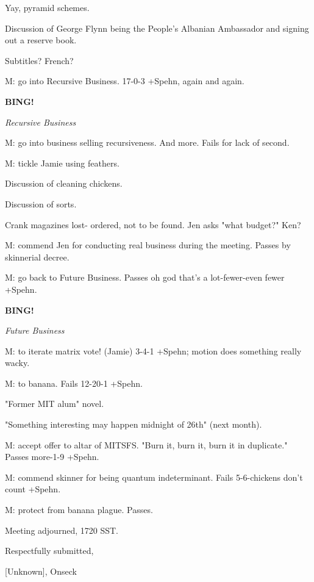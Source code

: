 \documentclass[12pt]{article}
\newcommand{\bing}{{\bf BING!} }
\newcommand{\goto}[1]{\bing \vskip 12pt \centerline{{\em{#1}}}}
\begin{document}
Yay, pyramid schemes.

Discussion of George Flynn being the People's Albanian Ambassador and signing out a reserve book.

Subtitles? French?

M: go into Recursive Business. 17-0-3 +Spehn, again and again.

\goto{Recursive Business}

M: go into business selling recursiveness. And more. Fails for lack of second.

M: tickle Jamie using feathers.

Discussion of cleaning chickens.

Discussion of sorts.

Crank magazines lost- ordered, not to be found. Jen asks "what budget?" Ken?

M: commend Jen for conducting real business during the meeting. Passes by skinnerial decree.

M: go back to Future Business. Passes oh god that's a lot-fewer-even fewer +Spehn.

\goto{Future Business}

M: to iterate matrix vote! (Jamie) 3-4-1 +Spehn; motion does something really wacky.

M: to banana. Fails 12-20-1 +Spehn.

"Former MIT alum" novel.

"Something interesting may happen midnight of 26th" (next month).

M: accept offer to altar of MITSFS. "Burn it, burn it, burn it in duplicate." Passes more-1-9 +Spehn.

M: commend skinner for being quantum indeterminant. Fails 5-6-chickens don't count +Spehn.

M: protect from banana plague. Passes.

\vspace{12pt}

\noindent
Meeting adjourned, 1720 SST.

\vspace{18pt}

\centerline{Respectfully submitted,}
\centerline{[Unknown], Onseck}
\end{document}
